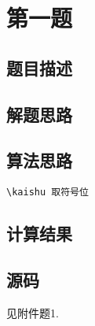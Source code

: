 \chapter{第一题}

\section{题目描述}


\section{解题思路}

\section{算法思路}

\begin{Verbatim}[]
\kaishu 取符号位

\end{Verbatim}

\section{计算结果}


\section{源码}
见附件题1.